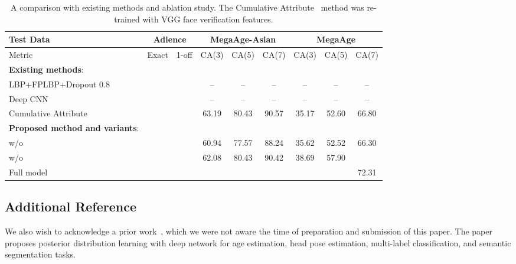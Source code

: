 \documentclass{bmvc2k}
\begin{document}
\begin{table}[t]
\begin{center}
\footnotesize
\caption{A comparison with existing methods and ablation study. The Cumulative Attribute~\cite{chen2013cumulative} method was re-trained with VGG face verification features.}
\begin{tabular}{l|cc|ccc|ccc}
\hline
Test Data & \multicolumn{2}{|c|}{Adience} & \multicolumn{3}{|c}{MegaAge-Asian} & \multicolumn{3}{|c}{MegaAge}  \\ \hline
Metric &  Exact & 1-off & CA(3) & CA(5) & CA(7) & CA(3) & CA(5) & CA(7) \\ \hline \hline
\textbf{Existing methods}: &  & & & \\
LBP+FPLBP+Dropout 0.8~\cite{eidinger2014age} &   &  & -- & -- & -- & -- & -- & -- \\
Deep CNN~\cite{levi2015age} &  &  & -- & -- & -- & -- & -- & --\\   
Cumulative Attribute~\cite{chen2013cumulative} &   &  & 63.19 & 80.43 & 90.57 & 35.17 & 52.60 & 66.80  \\
\hline 
\textbf{Proposed method and variants}: &  & & & \\
w/o  &   &  & 60.94 & 77.57 & 88.24 & 35.62 & 52.52 & 66.30\\ 
w/o  &  &  & 62.08 & 80.43 & 90.42 & 38.69 & 57.90 & \\ 
Full model &  &  &  &   &  &  &   & 72.31 \\  \hline
\end{tabular}
\label{tab:expSupervision}
\end{center}
\end{table}


\subsection*{Additional Reference}


We also wish to acknowledge a prior work~\cite{gao2017deep}, which we were not aware the time of preparation and submission of this paper. The paper~\cite{gao2017deep} proposes posterior distribution learning with deep network for age estimation, head pose estimation, multi-label classification, and semantic segmentation tasks. 

\newpage

\end{document}
